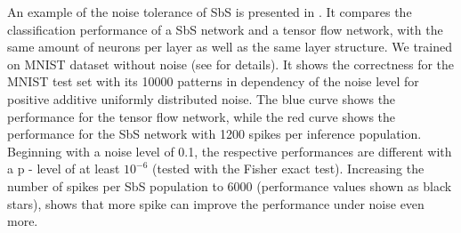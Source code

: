 An example of the noise tolerance of SbS is presented in
. It compares the classification performance of
a SbS network and a tensor flow network, with the same amount of
neurons per layer as well as the same layer structure. We trained on MNIST dataset\cite{lecun1998mnist} without noise (see \cite{rotermund2019Backpropagation} for details). It shows the correctness for the MNIST test set with its 10000 patterns in dependency of the noise level for positive additive
uniformly distributed noise. The blue curve shows the performance for
the tensor flow network, while the red curve shows the performance for
the SbS network with 1200 spikes per inference population. Beginning
with a noise level of 0.1, the respective performances are different
with a p - level of at least $10^{-6}$ (tested with the Fisher exact
test). Increasing the number of spikes per SbS population to 6000
(performance values shown as black stars), shows that more spike can
improve the performance under noise even more. 
